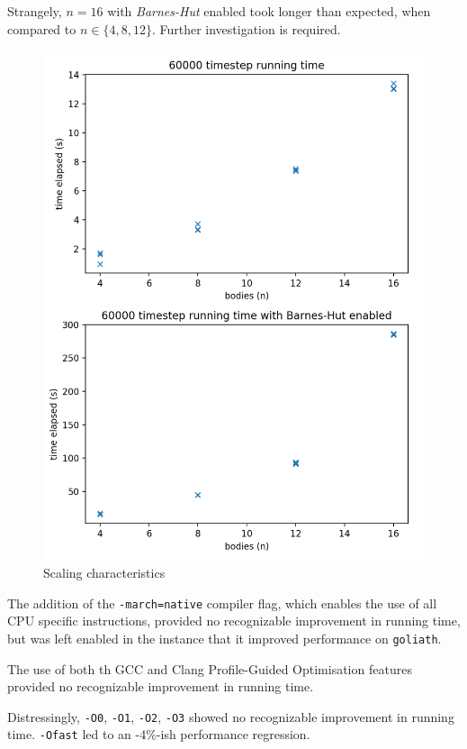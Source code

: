 \documentclass[11pt,a4paper]{article}
\begin{document}
Strangely, $n = 16$ with \textit{Barnes-Hut} enabled took longer than expected, when compared to $n \in \{ 4, 8, 12 \}$. Further investigation is required.
\begin{figure}[b]
\caption{Scaling characteristics}
\centering
\label{fig:performance}
\includegraphics[width=\textwidth]{performance}
\end{figure} 

The addition of the 
\texttt{-march=native} compiler flag, which enables the use of all CPU specific instructions, provided no recognizable improvement in running time, but was left enabled in the instance that it improved performance on \texttt{goliath}.

The use of both th GCC and Clang Profile-Guided Optimisation features provided no recognizable improvement in running time.

Distressingly, \texttt{-O0}, \texttt{-O1}, \texttt{-O2}, \texttt{-O3} showed no recognizable improvement in running time. \texttt{-Ofast} led to an -4\%-ish performance regression.
\end{document}
